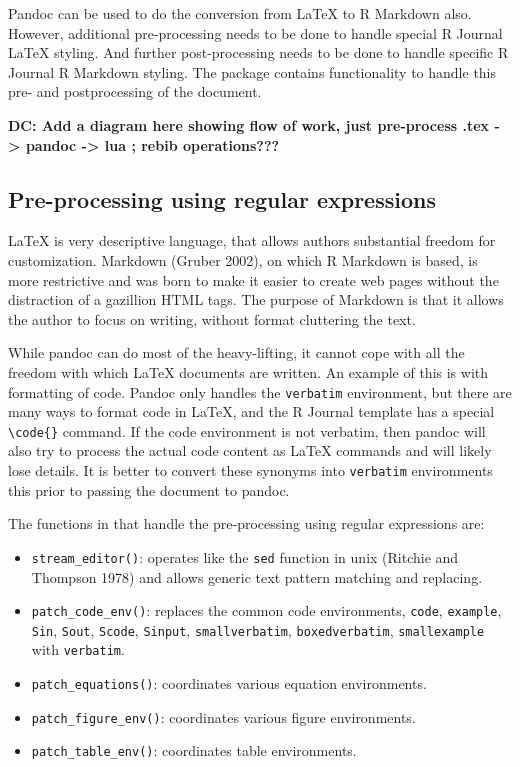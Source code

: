Pandoc can be used to do the conversion from LaTeX to R Markdown also. However, additional pre-processing needs to be done to handle special R Journal LaTeX styling. And further post-processing needs to be done to handle specific R Journal R Markdown styling. The  package contains functionality to handle this pre- and postprocessing of the document.

\textbf{DC: Add a diagram here showing flow of work, just pre-process .tex -\textgreater{} pandoc -\textgreater{} lua ; rebib operations???}

\hypertarget{pre-processing-using-regular-expressions}{%
\subsection{Pre-processing using regular expressions}\label{pre-processing-using-regular-expressions}}

LaTeX is very descriptive language, that allows authors substantial freedom for customization. Markdown (Gruber 2002), on which R Markdown is based, is more restrictive and was born to make it easier to create web pages without the distraction of a gazillion HTML tags. The purpose of Markdown is that it allows the author to focus on writing, without format cluttering the text.

While pandoc can do most of the heavy-lifting, it cannot cope with all the freedom with which LaTeX documents are written. An example of this is with formatting of code. Pandoc only handles the \texttt{verbatim} environment, but there are many ways to format code in LaTeX, and the R Journal template has a special \texttt{\textbackslash{}code\{\}} command. If the code environment is not verbatim, then pandoc will also try to process the actual code content as LaTeX commands and will likely lose details. It is better to convert these synonyms into \texttt{verbatim} environments this prior to passing the document to pandoc.

The functions in  that handle the pre-processing using regular expressions are:

\begin{itemize}
\tightlist
\item
  \texttt{stream\_editor()}: operates like the \texttt{sed} function in unix (Ritchie and Thompson 1978) and allows generic text pattern matching and replacing.
\item
  \texttt{patch\_code\_env()}: replaces the common code environments, \texttt{code}, \texttt{example}, \texttt{Sin}, \texttt{Sout}, \texttt{Scode}, \texttt{Sinput}, \texttt{smallverbatim}, \texttt{boxedverbatim}, \texttt{smallexample} with \texttt{verbatim}.
\item
  \texttt{patch\_equations()}: coordinates various equation environments.
\item
  \texttt{patch\_figure\_env()}: coordinates various figure environments.
\item
  \texttt{patch\_table\_env()}: coordinates table environments.
\end{itemize}

